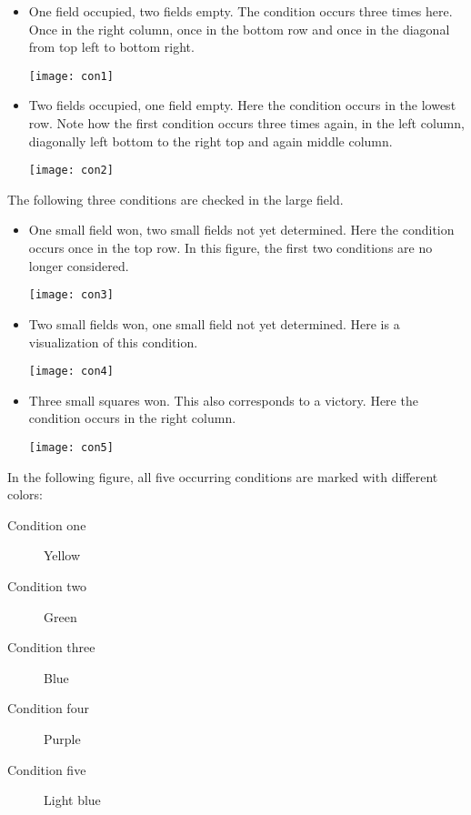 \begin{itemize}
\item One field occupied, two fields empty. The condition occurs three times here. Once in the right column, once in the bottom row and once in the diagonal from top left to bottom right.\\
\begin{fixedpic}
	\texttt{[image: con1]}
\end{fixedpic}
\item Two fields occupied, one field empty. Here the condition occurs in the lowest row. Note how the first condition occurs three times again, in the left column, diagonally left bottom to the right top and again  middle column.
\begin{fixedpic}
	\texttt{[image: con2]}
\end{fixedpic}
\end{itemize}
The following three conditions are checked in the large field.
\begin{itemize}
\item One small field won, two small fields not yet determined. Here the condition occurs once in the top row. In this figure, the first two conditions are no longer considered.\\
\begin{fixedpic}
	\texttt{[image: con3]}
\end{fixedpic}
\item Two small fields won, one small field not yet determined. Here is a visualization of this condition.\\
\begin{fixedpic}
	\centering
	\texttt{[image: con4]}
\end{fixedpic}
\item Three small squares won. This also corresponds to a victory. Here the condition occurs in the right column.\\
\begin{fixedpic}
	\centering
	\texttt{[image: con5]}
\end{fixedpic}
\end{itemize}
In the following figure, all five occurring conditions are marked with different colors:
\begin{description}
\item[Condition one] Yellow
\item[Condition two] Green
\item[Condition three] Blue
\item[Condition four] Purple
\item[Condition five] Light blue
\end{description}
